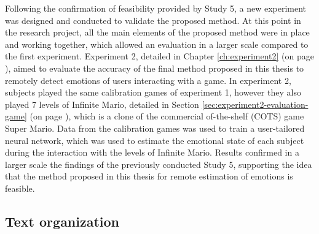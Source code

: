 Following the confirmation of feasibility provided by Study 5, a new experiment was designed and conducted to validate the proposed method. At this point in the research project, all the main elements of the proposed method were in place and working together, which allowed an evaluation in a larger scale compared to the first experiment. Experiment 2, detailed in Chapter \ref{ch:experiment2} (on page \pageref{ch:experiment2}), aimed to evaluate the accuracy of the final method proposed in this thesis to remotely detect emotions of users interacting with a game. In experiment 2, subjects played the same calibration games of experiment 1, however they also played 7 levels of Infinite Mario, detailed in Section \ref{sec:experiment2-evaluation-game} (on page \pageref{sec:experiment2-evaluation-game}), which is a clone of the commercial of-the-shelf (COTS) game Super Mario. Data from the calibration games was used to train a user-tailored neural network, which was used to estimate the emotional state of each subject during the interaction with the levels of Infinite Mario. Results confirmed in a larger scale the findings of the previously conducted Study 5, supporting the idea that the method proposed in this thesis for remote estimation of emotions is feasible.

\subsection{Text organization}

